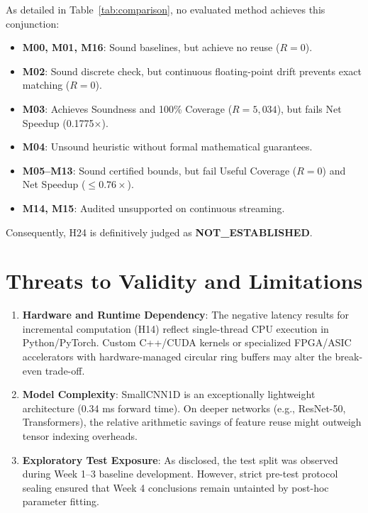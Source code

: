 \documentclass[10pt,twocolumn]{article}
\begin{document}
As detailed in Table~\ref{tab:comparison}, no evaluated method achieves this conjunction:
\begin{itemize}
    \item \textbf{M00, M01, M16}: Sound baselines, but achieve no reuse ($R=0$).
    \item \textbf{M02}: Sound discrete check, but continuous floating-point drift prevents exact matching ($R=0$).
    \item \textbf{M03}: Achieves Soundness and 100\% Coverage ($R=5,034$), but fails Net Speedup (0.1775$\times$).
    \item \textbf{M04}: Unsound heuristic without formal mathematical guarantees.
    \item \textbf{M05--M13}: Sound certified bounds, but fail Useful Coverage ($R=0$) and Net Speedup ($\le 0.76\times$).
    \item \textbf{M14, M15}: Audited unsupported on continuous streaming.
\end{itemize}
Consequently, H24 is definitively judged as \textbf{NOT\_ESTABLISHED}.

\section{Threats to Validity and Limitations}
\begin{enumerate}
    \item \textbf{Hardware and Runtime Dependency}: The negative latency results for incremental computation (H14) reflect single-thread CPU execution in Python/PyTorch. Custom C++/CUDA kernels or specialized FPGA/ASIC accelerators with hardware-managed circular ring buffers may alter the break-even trade-off.
    \item \textbf{Model Complexity}: SmallCNN1D is an exceptionally lightweight architecture (0.34 ms forward time). On deeper networks (e.g., ResNet-50, Transformers), the relative arithmetic savings of feature reuse might outweigh tensor indexing overheads.
    \item \textbf{Exploratory Test Exposure}: As disclosed, the test split was observed during Week 1--3 baseline development. However, strict pre-test protocol sealing ensured that Week 4 conclusions remain untainted by post-hoc parameter fitting.
\end{enumerate}
\end{document}
